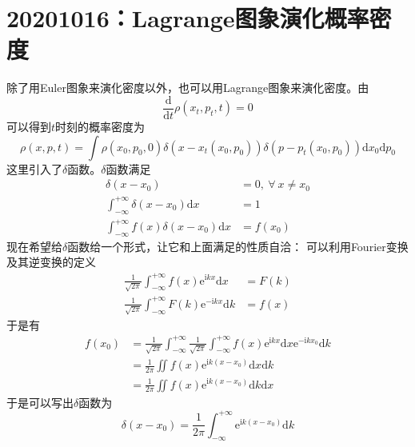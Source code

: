 \documentclass[12pt]{article}
\begin{document}
\section{20201016：Lagrange图象演化概率密度}

    除了用Euler图象来演化密度以外，也可以用Lagrange图象来演化密度。由
    \begin{equation}
        \frac {\mathrm{d}}{\mathrm{d}t} \rho(x_t,p_t,t) = 0
    \end{equation}
    可以得到$t$时刻的概率密度为
    \begin{equation}
        \rho(x,p,t) = \int \rho(x_0,p_0,0)\delta(x-x_t(x_0,p_0)) \delta(p-p_t(x_0,p_0)) \mathrm{d}x_0\mathrm{d}p_0
    \end{equation}
    这里引入了$\delta$函数。$\delta$函数满足
    \begin{equation}\begin{aligned}
        \delta(x-x_0) &= 0, \ \forall \ x \neq x_0\\
        \int_{-\infty}^{+\infty} \delta(x-x_0) \mathrm{d}x &= 1\\
        \int_{-\infty}^{+\infty} f(x)\delta(x-x_0) \mathrm{d}x &= f(x_0)
    \end{aligned}\end{equation}
    现在希望给$\delta$函数给一个形式，让它和上面满足的性质自洽：
    可以利用Fourier变换及其逆变换的定义
    \begin{equation}\begin{aligned}
        \frac 1{\sqrt{2\pi}} \int_{-\infty}^{+\infty} f(x)\mathrm{e}^{\mathrm{i}kx}\mathrm{d}x &= F(k)\\
        \frac 1{\sqrt{2\pi}} \int_{-\infty}^{+\infty} F(k)\mathrm{e}^{-\mathrm{i}kx}\mathrm{d}k &= f(x)
    \end{aligned}\end{equation}
    于是有
    \begin{equation}\begin{aligned}
        f(x_0) &= \frac 1{\sqrt{2\pi}} \int_{-\infty}^{+\infty} \frac 1{\sqrt{2\pi}} \int_{-\infty}^{+\infty} f(x)\mathrm{e}^{\mathrm{i}kx}\mathrm{d}x \mathrm{e}^{-\mathrm{i}kx_0}\mathrm{d}k\\
        &= \frac 1{2\pi} \iint f(x)\mathrm{e}^{\mathrm{i}k(x-x_0)}\mathrm{d}x\mathrm{d}k\\
        &= \frac 1{2\pi} \iint f(x)\mathrm{e}^{\mathrm{i}k(x-x_0)}\mathrm{d}k\mathrm{d}x
    \end{aligned}\end{equation}
    于是可以写出$\delta$函数为
    \begin{equation}
        \delta(x-x_0) = \frac 1{2\pi} \int_{-\infty}^{+\infty} \mathrm{e}^{\mathrm{i}k(x-x_0)}\mathrm{d}k
    \end{equation}
\end{document}
